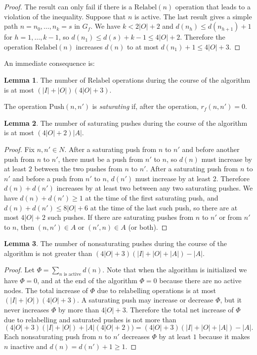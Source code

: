 \documentclass[12pt, A4paper]{article}
\theoremstyle{definition}
\newtheorem{lem}{Lemma}
\begin{document}
\begin{proof}
  The result can only fail if there is a $\mathrm{Relabel}(n)$ operation that leads to a violation of the inequality.  Suppose that $n$ is active.  The last result gives a simple path $n = n_0, \ldots, n_k = s$ in $G_f$.  We have $k < 2|O| + 2$ and $d(n_h) \le d(n_{h+1}) + 1$ for $h = 1, \ldots, k-1$, so $d(n_1) \le d(s) + k - 1 \le 4|O| + 2$.   Therefore the operation $\mathrm{Relabel}(n)$ increases $d(n)$ to at most $d(n_1) + 1 \le 4|O| + 3$.
\end{proof}  

An immediate consequence is:

\begin{lem}
    The number of $\mathrm{Relabel}$ operations during the course of the algorithm is at most $(|I| + |O|)(4|O| + 3)$.
\end{lem}

The operation $\mathrm{Push}(n,n')$ is \emph{saturating} if, after the operation, $r_f(n,n') = 0$.

\begin{lem}
  The number of saturating pushes during the course of the algorithm is at most $(4|O| + 2) |A|$.
\end{lem}

\begin{proof}
  Fix $n, n' \in N$.  After a saturating push from $n$ to $n'$ and before another push from $n$ to $n'$, there must be a push from $n'$ to $n$, so $d(n)$ must increase by at least $2$ between the two pushes from $n$ to $n'$.  After a saturating push from $n$ to $n'$ and before a push from $n'$ to $n$, $d(n')$ must increase by at least 2.  Therefore $d(n) + d(n')$ increases by at least two between any two saturating pushes.  We have $d(n) + d(n') \ge 1$ at the time of the first saturating push, and $d(n) + d(n') \le 8|O| + 6$ at the time of the last such push, so there are at most $4|O| + 2$ such pushes.  If there are saturating pushes from $n$ to $n'$ or from $n'$ to $n$, then $(n,n') \in A$ or $(n',n) \in A$ (or both).  
\end{proof}

\begin{lem}
  The number of nonsaturating pushes during the course of the algorithm is not greater than $(4|O| + 3)(|I| + |O| + |A|) - |A|$.
\end{lem}

\begin{proof}
  Let $\Phi = \sum_{\text{$n$ is active}} d(n)$.  Note that when the algorithm is initialized we have $\Phi = 0$, and at the end of the algorithm $\Phi = 0$ because there are no active nodes.  The total increase of $\Phi$ due to relabelling operations is at most $(|I| + |O|)(4|O| + 3)$.  A saturating push may increase or decrease $\Phi$, but it never increases $\Phi$ by more than $4|O| + 3$.  Therefore the total net increase of $\Phi$ due to relabelling and saturated pushes is not more than $$(4|O| + 3)(|I| + |O|) +  |A|(4|O| + 2)) = (4|O| + 3)(|I| + |O| + |A|) - |A|.$$  Each nonsaturating push from $n$ to $n'$ decreases $\Phi$ by at least $1$ because it makes $n$ inactive and $d(n) = d(n') + 1 \ge 1$. 
\end{proof}
\end{document}
